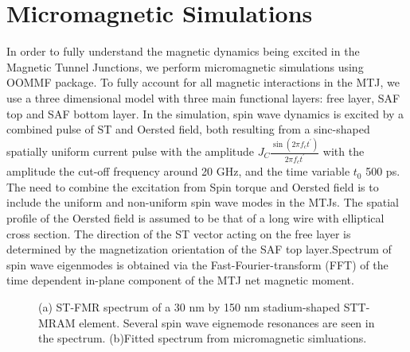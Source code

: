 \section{Micromagnetic Simulations}
In order to fully understand the magnetic dynamics being excited in the Magnetic Tunnel Junctions, we perform micromagnetic simulations using OOMMF package\cite{OOMMF}. To fully account for all magnetic interactions in the MTJ, we use a three dimensional model with three main functional layers: free layer, SAF top and SAF bottom layer. In the simulation, spin wave dynamics is excited by a combined pulse of ST and Oersted field, both resulting from a sinc-shaped spatially uniform current pulse with the amplitude $J_{C}\frac{\sin(2\pi f_{c} t^{'})}{2\pi f_{c}t^{'}} $ with the amplitude the cut-off frequency around 20 GHz, and the time variable $t_{0}$ 500 ps. The need to combine the excitation from Spin torque and Oersted field is to include the uniform and non-uniform spin wave modes in the MTJs\cite{Modes}.
The spatial profile of the Oersted field is assumed to be that of a long wire with elliptical cross section. The direction of the ST vector acting on the free layer is determined by the magnetization orientation of the SAF top layer.Spectrum of spin wave eigenmodes is obtained via the Fast-Fourier-transform (FFT) of the time dependent in-plane component of the MTJ net magnetic moment. 




\begin{figure}[!ht]
\centering
{}
\caption{(a) ST-FMR spectrum of a 30 nm by 150 nm stadium-shaped STT-MRAM element. Several spin wave eignemode resonances are seen in the spectrum. (b)Fitted spectrum from micromagnetic simluations.}
\end{figure}

